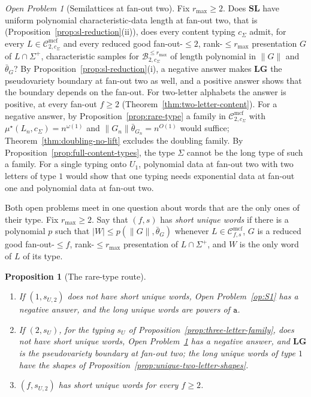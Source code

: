 \documentclass[11pt]{article}
\numberwithin{equation}{section}
\theoremstyle{plain}
\newtheorem{proposition}[theorem]{Proposition}
\theoremstyle{definition}
\theoremstyle{remark}
\newtheorem{openproblem}[theorem]{Open Problem}
\newcommand{\Cmcf}[2]{\mathcal{C}^{\mathrm{mcf}}_{#1,#2}}
\theoremstyle{plain}
\begin{document}
\begin{openproblem}[Semilattices at fan-out two]
\label{op:fanout-two-sl}
Fix $r_{\max}\ge2$.  Does $\mathbf{SL}$ have uniform polynomial
characteristic-data length at fan-out two, that is
(Proposition~\ref{prop:sl-reduction}(ii)), does every content typing
$c_\Sigma$ admit, for every $L\in\Cmcf{2}{c_\Sigma}$ and every reduced good
fan-out-$\le2$, rank-$\le r_{\max}$ presentation $G$ of $L\cap\Sigma^+$,
characteristic samples for $\mathcal B^{\le r_{\max}}_{2,c_\Sigma}$ of length
polynomial in $\|G\|$ and $\bar\theta_G$?  By
Proposition~\ref{prop:sl-reduction}(i), a negative answer makes $\mathbf{LG}$
the pseudovariety boundary at fan-out two as well, and a positive answer
shows that the boundary depends on the fan-out.  For two-letter alphabets the
answer is positive, at every fan-out $f\ge2$
(Theorem~\ref{thm:two-letter-content}).  For a negative answer, by
Proposition~\ref{prop:rare-type} a family in $\Cmcf{2}{c_\Sigma}$ with
$\mu^\star(L_n,c_\Sigma)=n^{\omega(1)}$ and $\|G_n\|\bar\theta_{G_n}=n^{O(1)}$
would suffice; Theorem~\ref{thm:doubling-no-lift} excludes the doubling family.  By Proposition~\ref{prop:full-content-types}, the type $\Sigma$ cannot be the long type of such a family.  For a single typing onto $U_1$, polynomial data at fan-out
two with two letters of type $1$ would show that one typing needs exponential
data at fan-out one and polynomial data at fan-out two.
\end{openproblem}

Both open problems meet in one question about words that are the only ones of
their type.  Fix $r_{\max}\ge2$.  Say that $(f,s)$ has \emph{short unique words}
if there is a polynomial $p$ such that $|W|\le p(\|G\|,\bar\theta_G)$ whenever
$L\in\Cmcf{f}{s}$, $G$ is a reduced good fan-out-$\le f$, rank-$\le r_{\max}$
presentation of $L\cap\Sigma^+$, and $W$ is the only word of $L$ of its type.

\begin{proposition}[The rare-type route]
\label{prop:unique-word-route}
\begin{enumerate}[label=\textup{(\roman*)},leftmargin=*]
\item If $(1,s_{U,2})$ does not have short unique words, Open
Problem~\ref{op:S1} has a negative answer, and the long unique words are
powers of $\mathtt a$.
\item If $(2,s_U)$, for the typing $s_U$ of
Proposition~\ref{prop:three-letter-family}, does not have short unique words,
Open Problem~\ref{op:fanout-two-sl} has a negative answer, and $\mathbf{LG}$ is the
pseudovariety boundary at fan-out two; the long unique words of type $1$ have the
shapes of Proposition~\ref{prop:unique-two-letter-shapes}.
\item $(f,s_{U,2})$ has short unique words for every $f\ge2$.
\end{enumerate}
\end{proposition}
\end{document}

